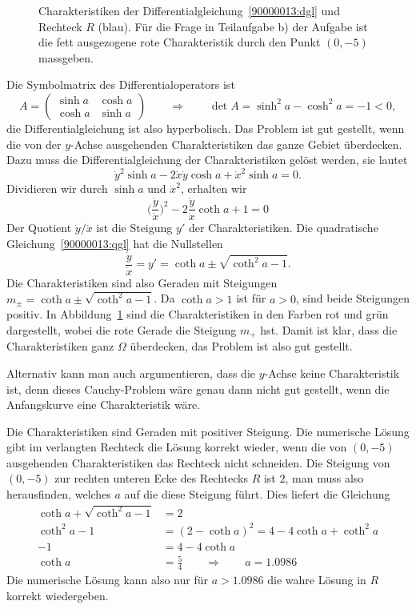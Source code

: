 \begin{loesung}
\begin{figure}
\centering
{}
\caption{Charakteristiken der Differentialgleichung~\eqref{90000013:dgl}
und Rechteck $R$ (blau). 
Für die Frage in Teilaufgabe b) der Aufgabe ist die fett ausgezogene
rote Charakteristik durch den Punkt $(0,-5)$ massgeben.
\label{90000013:domain}}
\end{figure}
\begin{teilaufgaben}
\item
Die Symbolmatrix des Differentialoperators ist
\[
A=\begin{pmatrix}\sinh a&\cosh a \\ \cosh a&\sinh a\end{pmatrix}
\qquad\Rightarrow\qquad
\det A=\sinh^2 a - \cosh^2 a = -1<0,
\]
die Differentialgleichung ist also hyperbolisch.
Das Problem ist gut gestellt, wenn die von der $y$-Achse ausgehenden
Charakteristiken das ganze Gebiet überdecken. 
Dazu muss die Differentialgleichung der Charakteristiken gelöst werden,
sie lautet
\[
\dot y^2
\sinh a
-2
\dot x\dot y
\cosh a
+
\dot x^2
\sinh a
=0.
\]
Dividieren wir durch $\sinh a $ und $\dot x^2$, erhalten wir
\begin{equation}
\biggl(\frac{\dot y}{\dot x}\biggr)^2
-2\frac{\dot y}{\dot x} \coth a + 1=0
\label{90000013:qgl}
\end{equation}
Der Quotient $\dot y/\dot x$ ist die Steigung $y'$ der Charakteristiken.
Die quadratische Gleichung~\eqref{90000013:qgl} hat die Nullstellen
\[
\frac{\dot y}{\dot x}=y'=
\coth a\pm\sqrt{\coth^2 a-1}
.
\]
Die Charakteristiken sind also Geraden mit Steigungen
$m_{\pm}=\coth a\pm\sqrt{\coth^2a-1}$.
Da $\coth a>1$ ist für $a>0$, sind beide Steigungen positiv.
In Abbildung~\ref{90000013:domain} sind die Charakteristiken in den Farben
rot und grün dargestellt, wobei die rote Gerade die Steigung $m_+$ hst.
Damit ist klar, dass die Charakteristiken ganz $\Omega$ überdecken, das
Problem ist also gut gestellt.

Alternativ kann man auch argumentieren, dass die $y$-Achse keine 
Charakteristik ist, denn dieses Cauchy-Problem wäre genau dann
nicht gut gestellt, wenn die Anfangskurve eine Charakteristik wäre.
\item
Die Charakteristiken sind Geraden mit positiver Steigung.
Die numerische Lösung gibt im verlangten Rechteck die Lösung
korrekt wieder, wenn die von $(0,-5)$ ausgehenden Charakteristiken
das Rechteck nicht schneiden.
Die Steigung von $(0,-5)$ zur rechten unteren Ecke des Rechtecks $R$
ist $2$, 
man muss also herausfinden, welches $a$ auf die diese Steigung führt.
Dies liefert die Gleichung
\begin{align*}
\coth a + \sqrt{\coth^2 a-1}&=2
\\
\coth^2 a-1&=(2-\coth a)^2=4-4\coth a +\coth^2 a
\\
-1 &=4-4\coth a
\\
\coth a&=\frac54
\qquad\Rightarrow\qquad
a=1.0986
\end{align*}
Die numerische Lösung kann also nur für $a>1.0986$ die wahre Lösung in
$R$ korrekt wiedergeben.
\qedhere
\end{teilaufgaben}
\end{loesung}

